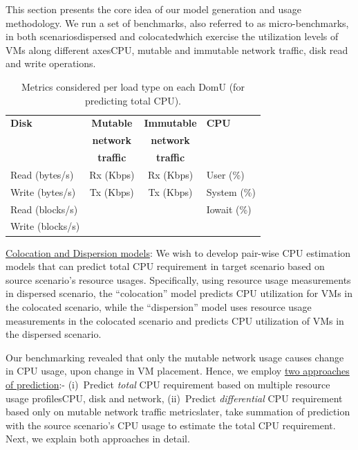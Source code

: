 

This section presents the core idea of our model generation and usage methodology.
We run a set of benchmarks, also referred to as micro-benchmarks, in both 
scenarios\textemdash{}dispersed and colocated\textemdash{}which exercise the utilization 
levels of VMs along different
axes\textemdash{}CPU, mutable and immutable network traffic, disk read and
write operations.


 \begin{table}
 \caption{Metrics considered per load type on each DomU (for predicting total CPU).}
 \begin{center}
 \begin{tabular}{|l|c|c|l|} \hline
  \bf{Disk} & \bf{Mutable} & \bf{Immutable} & \bf{CPU} \\ 
 & \bf{network} & \bf{network} & \\
  & \bf{traffic} & \bf{traffic} & \\ \hline
  Read (bytes/s) & Rx (Kbps) & Rx (Kbps) & User (\%) \\
  Write (bytes/s) & Tx (Kbps) & Tx (Kbps) & System (\%) \\
  Read (blocks/s) &  &  & Iowait (\%) \\
  Write (blocks/s) & &  & \\ \hline
 \end{tabular}
 \label{metrics-table}
 \end{center}
 \end{table}

\underline{Colocation and Dispersion models}: We wish to 
develop pair-wise CPU estimation models
that can predict total CPU requirement in target scenario
based on source scenario's resource usages.
Specifically, using resource usage measurements in
dispersed scenario, the ``colocation''
model predicts CPU utilization for VMs in the colocated scenario,
while the ``dispersion''
model uses resource usage measurements in the colocated scenario and 
predicts CPU utilization of VMs in the dispersed scenario.

Our benchmarking revealed that only the mutable network usage
causes change in CPU usage, upon change in VM placement.
Hence, we employ \underline{two approaches of prediction}:-
(i)~Predict \textit{total} CPU requirement based on multiple
resource usage profiles\textemdash{}CPU, disk and network,
(ii)~Predict \textit{differential} CPU requirement based only on
mutable network traffic metrics\textemdash{}later, take summation
of prediction with the source scenario's CPU usage to estimate
the total CPU requirement.
Next, we explain both approaches in detail.

